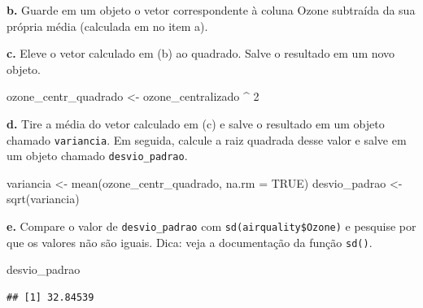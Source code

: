 \documentclass[
]{book}
\newenvironment{Shaded}{\begin{snugshade}}{\end{snugshade}}
\newcommand{\AttributeTok}[1]{\textcolor[rgb]{0.77,0.63,0.00}{#1}}
\newcommand{\ConstantTok}[1]{\textcolor[rgb]{0.00,0.00,0.00}{#1}}
\newcommand{\DecValTok}[1]{\textcolor[rgb]{0.00,0.00,0.81}{#1}}
\newcommand{\FunctionTok}[1]{\textcolor[rgb]{0.00,0.00,0.00}{#1}}
\newcommand{\NormalTok}[1]{#1}
\newcommand{\OtherTok}[1]{\textcolor[rgb]{0.56,0.35,0.01}{#1}}
\newcommand{\SpecialCharTok}[1]{\textcolor[rgb]{0.00,0.00,0.00}{#1}}
\begin{document}
\textbf{b.} Guarde em um objeto o vetor correspondente à coluna Ozone subtraída da sua própria média (calculada em no item a).

\begin{Shaded}
\end{Shaded}

\textbf{c.} Eleve o vetor calculado em (b) ao quadrado. Salve o resultado em um novo objeto.

\begin{Shaded}
\begin{Highlighting}[]
\NormalTok{ozone\_centr\_quadrado }\OtherTok{\textless{}{-}}\NormalTok{ ozone\_centralizado }\SpecialCharTok{\^{}} \DecValTok{2}
\end{Highlighting}
\end{Shaded}

\textbf{d.} Tire a média do vetor calculado em (c) e salve o resultado em um objeto chamado \texttt{variancia}. Em seguida, calcule a raiz quadrada desse valor e salve em um objeto chamado \texttt{desvio\_padrao}.

\begin{Shaded}
\begin{Highlighting}[]
\NormalTok{variancia }\OtherTok{\textless{}{-}} \FunctionTok{mean}\NormalTok{(ozone\_centr\_quadrado, }\AttributeTok{na.rm =} \ConstantTok{TRUE}\NormalTok{)}
\NormalTok{desvio\_padrao }\OtherTok{\textless{}{-}} \FunctionTok{sqrt}\NormalTok{(variancia)}
\end{Highlighting}
\end{Shaded}

\textbf{e.} Compare o valor de \texttt{desvio\_padrao} com \texttt{sd(airquality\$Ozone)} e pesquise por que os valores não são iguais. Dica: veja a documentação da função \texttt{sd()}.

\begin{Shaded}
\begin{Highlighting}[]
\NormalTok{desvio\_padrao}
\end{Highlighting}
\end{Shaded}

\begin{verbatim}
## [1] 32.84539
\end{verbatim}
\end{document}
